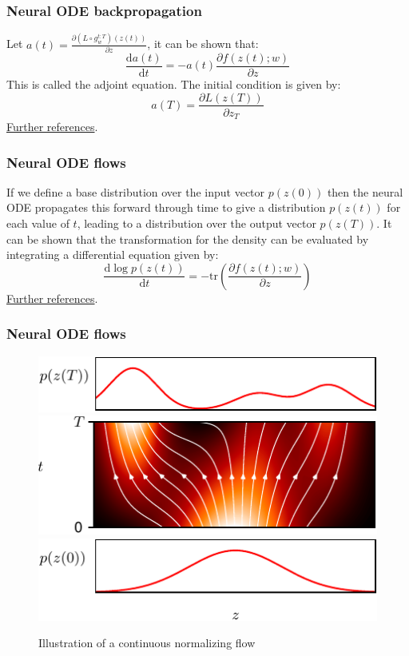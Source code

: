 \documentclass{beamer}
\begin{document}
\begin{frame}
    \frametitle{Neural ODE backpropagation}
    Let $a(t)=\frac{\partial{}(L\circ{}g^{t:T}_{w})(z(t))}{\partial{}z}$, it can be shown that:
    \begin{equation*}
        \frac{\mathrm{d}a(t)}{\mathrm{d}t}=-a(t)\frac{\partial{f(z(t);w)}}{\partial{}z}
    \end{equation*}
    This is called the adjoint equation. The initial condition is given by:
    \begin{equation*}
        a(T)=\frac{\partial{}L(z(T))}{\partial{}z_{T}}
    \end{equation*}
    \href{https://ilya.schurov.com/post/adjoint-method/}{Further references}.
\end{frame}

\begin{frame}
    \frametitle{Neural ODE flows}
    If we define a base distribution over the input vector $p(z(0))$ then the neural ODE propagates this forward through time to give a distribution $p(z(t))$ for each value of $t$, leading to a distribution over the output vector $p(z(T))$. It can be shown that the transformation for the density can be evaluated by integrating a differential equation given by:
    \begin{equation*}
        \frac{\mathrm{d}\log{}p(z(t))}{\mathrm{d}t}=-\mathrm{tr}(\frac{\partial{}f(z(t);w)}{\partial{}z})
    \end{equation*}
    \href{https://arxiv.org/pdf/1806.07366}{Further references}.
\end{frame}

\begin{frame}
    \frametitle{Neural ODE flows}
    \begin{figure}
        \caption{Illustration of a continuous normalizing flow}
        \includegraphics{Figure_6_a.pdf}
        \includegraphics{Figure_6_b.pdf}
        \includegraphics{Figure_6_c.pdf}
    \end{figure}
\end{frame}
\end{document}
